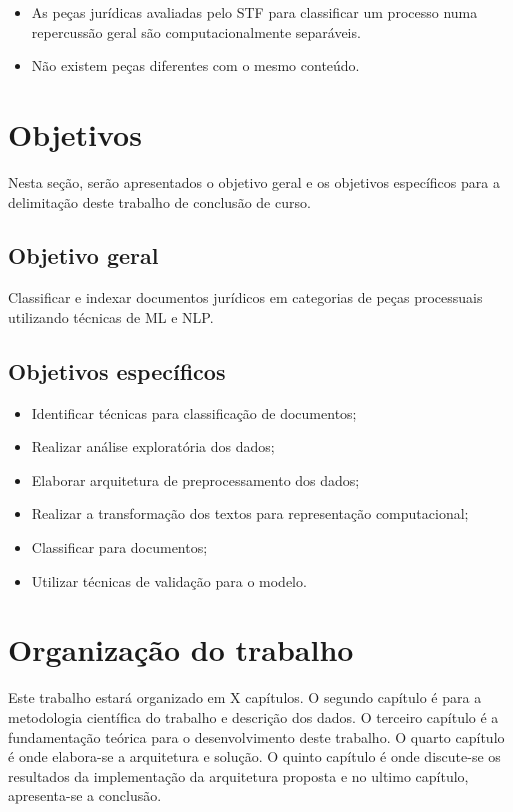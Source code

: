 \begin{itemize}
	\item As peças jurídicas avaliadas pelo STF para classificar um processo numa repercussão geral são computacionalmente separáveis.
    \item Não existem peças diferentes com o mesmo conteúdo.
\end{itemize}

\section{Objetivos}
Nesta seção, serão apresentados o objetivo geral e os objetivos específicos para a delimitação deste trabalho de conclusão de curso.

\subsection{Objetivo geral}

Classificar e indexar documentos jurídicos em categorias de peças processuais utilizando técnicas de ML e NLP.

\subsection{Objetivos específicos}    

\begin{itemize}
  \item Identificar técnicas para classificação de documentos;
  \item Realizar análise exploratória dos dados;
  \item Elaborar arquitetura de preprocessamento dos dados;
  \item Realizar a transformação dos textos para representação computacional;
  \item Classificar para documentos;
  \item Utilizar técnicas de validação para o modelo.
\end{itemize}

\section{Organização do trabalho}
	Este trabalho estará organizado em X capítulos. O segundo capítulo é para a metodologia científica do trabalho e descrição dos dados. O terceiro capítulo é a fundamentação teórica para o desenvolvimento deste trabalho. O quarto capítulo é onde elabora-se a arquitetura e solução. O quinto capítulo é onde discute-se os resultados da implementação da arquitetura proposta e no ultimo capítulo, apresenta-se a conclusão.
